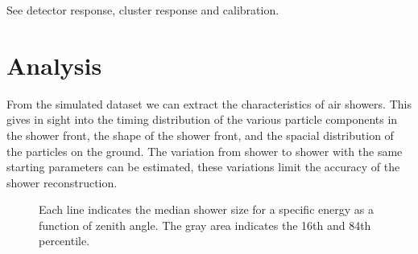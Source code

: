 

See detector response, cluster response and calibration.


\section{Analysis}

From the simulated dataset we can extract the characteristics of air showers. This gives in sight into the timing distribution of the various particle components in the shower front, the shape of the shower front, and the spacial distribution of the particles on the ground. The variation from shower to shower with the same starting parameters can be estimated, these variations limit the accuracy of the shower reconstruction.

\begin{figure}
    \centering
    
    \caption{
             Each line indicates the median shower size for a specific
             energy as a function of zenith angle. The gray area
             indicates the 16th and 84th percentile.}
    \label{fig:simulations_shower_sizes}
\end{figure}
